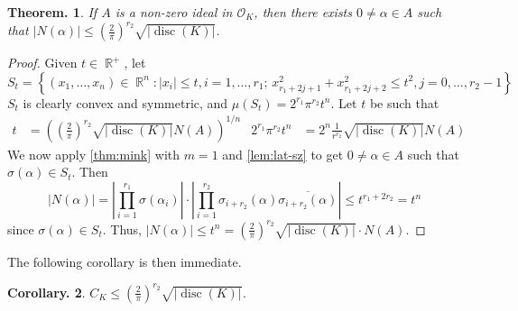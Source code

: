 \documentclass[11pt, a4paper]{memoir}
\DeclareMathOperator{\R}{{\mathbb{R}}}
\newcommand{\ol}[1]{\ensuremath{\overline{#1}}}
\theoremstyle{change}
\newtheorem{theorem}{Theorem.}[section]
\newtheorem{corollary}[theorem]{Corollary.}
\theoremstyle{plain}
\theoremstyle{nonumberplain}
\newtheorem{proof}{Proof}
\DeclareMathOperator{\disc}{disc}
\numberwithin{equation}{section}
\begin{document}
\begin{theorem}
    If $A$ is a non-zero ideal in $\mathcal{O}_K$, then there exists $0\neq\alpha\in A$ such that $|N(\alpha)|\leq\left(\frac{2}{\pi}\right)^{r_2}\sqrt{|\disc(K)|}$.
\end{theorem}
\begin{proof}
    Given $t\in\R^+$, let
    \begin{equation*}
        S_t=\left\{(x_1,\ldots,x_n)\in\R^n:|x_i|\leq t,i=1,\ldots,r_1;\, x_{r_1+2j+1}^2+x_{r_1+2j+2}^2\leq t^2, j=0,\ldots,r_2-1\right\}
    \end{equation*}
    $S_t$ is clearly convex and symmetric, and $\mu(S_t)=2^{r_1}\pi^{r_2}t^n$.
    Let $t$ be such that
    \begin{align*}
        t&=\left(\left(\frac{2}{\pi}\right)^{r_2}\sqrt{|\disc(K)|}N(A)\right)^{1/n} & 2^{r_1}\pi^{r_2}t^n&=2^n\frac{1}{r^{r_2}}\sqrt{|\disc(K)|}N(A)
    \end{align*}
    We now apply \cref{thm:mink} with $m=1$ and \cref{lem:lat-sz} to get $0\neq\alpha\in A$ such that $\sigma(\alpha)\in S_t$.
    Then
    \begin{equation*}
        |N(\alpha)|=\left\lvert\prod_{i=1}^{r_1}\sigma(\alpha_i)\right\rvert\cdot\left\lvert\prod_{i=1}^{r_2}\sigma_{i+r_2}(\alpha)\ol{\sigma_{i+r_2}(\alpha)}\right\rvert
        \leq t^{r_1+2r_2}=t^n
    \end{equation*}
    since $\sigma(\alpha)\in S_t$.
    Thus, $|N(\alpha)|\leq t^n=\left(\frac{2}{\pi}\right)^{r_2}\sqrt{|\disc(K)|}\cdot N(A)$.
\end{proof}
The following corollary is then immediate.
\begin{corollary}
    $C_K\leq\left(\frac{2}{\pi}\right)^{r_2}\sqrt{|\disc(K)|}$.
\end{corollary}
\end{document}
